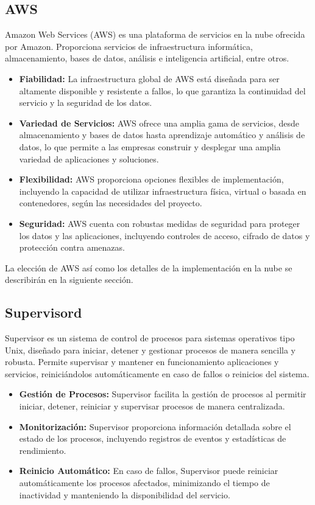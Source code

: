 \subsection*{AWS}
Amazon Web Services (AWS) es una plataforma de servicios en la nube ofrecida por Amazon. Proporciona servicios de infraestructura informática, almacenamiento, bases de datos, análisis e inteligencia artificial, entre otros.

\begin{itemize}
	\item \textbf{Fiabilidad:} La infraestructura global de AWS está diseñada para ser altamente disponible y resistente a fallos, lo que garantiza la continuidad del servicio y la seguridad de los datos.
	\item \textbf{Variedad de Servicios:} AWS ofrece una amplia gama de servicios, desde almacenamiento y bases de datos hasta aprendizaje automático y análisis de datos, lo que permite a las empresas construir y desplegar una amplia variedad de aplicaciones y soluciones.
	\item \textbf{Flexibilidad:} AWS proporciona opciones flexibles de implementación, incluyendo la capacidad de utilizar infraestructura física, virtual o basada en contenedores, según las necesidades del proyecto.
	\item \textbf{Seguridad:} AWS cuenta con robustas medidas de seguridad para proteger los datos y las aplicaciones, incluyendo controles de acceso, cifrado de datos y protección contra amenazas.
\end{itemize}

La elección de AWS así como los detalles de la implementación en la nube se describirán en la siguiente sección.

\subsection*{Supervisord}
Supervisor es un sistema de control de procesos para sistemas operativos tipo Unix, diseñado para iniciar, detener y gestionar procesos de manera sencilla y robusta. Permite supervisar y mantener en funcionamiento aplicaciones y servicios, reiniciándolos automáticamente en caso de fallos o reinicios del sistema.

\begin{itemize}
	\item \textbf{Gestión de Procesos:} Supervisor facilita la gestión de procesos al permitir iniciar, detener, reiniciar y supervisar procesos de manera centralizada.
	\item \textbf{Monitorización:} Supervisor proporciona información detallada sobre el estado de los procesos, incluyendo registros de eventos y estadísticas de rendimiento.
	\item \textbf{Reinicio Automático:} En caso de fallos, Supervisor puede reiniciar automáticamente los procesos afectados, minimizando el tiempo de inactividad y manteniendo la disponibilidad del servicio.
\end{itemize}

